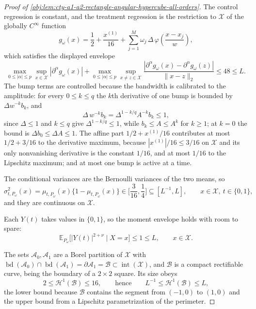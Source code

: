 \begin{proof}[Proof of \cref{obj:lem:cty-a1-a2-rectangle-angular-hypercube-all-orders}]
The control regression is constant, and the treatment regression is the restriction to \(\mathcal X\) of the globally \(C^\infty\) function
\[
g_\omega(x)=\frac12+\frac{x^{(1)}}{16}
+\sum_{j=1}^{M}\omega_j\,\Delta\,\varphi\!\left(\frac{x-x_j}{w}\right),
\]
which satisfies the displayed envelope
\[
\max_{0\leq|\alpha|\leq p}\sup_{x\in\mathcal X}|\partial^\alpha g_\omega(x)|
+
\max_{0\leq|\alpha|\leq p}\sup_{x\neq z\in\mathcal X}
\frac{|\partial^\alpha g_\omega(x)-\partial^\alpha g_\omega(z)|}{\lVert x-z\rVert_2}
\leq 48\leq L .
\]
The bump terms are controlled because the bandwidth is calibrated to the amplitude: for every \(0\leq k\leq q\) the \(k\)th derivative of one bump is bounded by \(\Delta w^{-k}b_k\), and
\[
\Delta\,w^{-k}b_k=\Delta^{1-k/q}A^{-k}b_k\leq1,
\]
since \(\Delta\leq1\) and \(k\leq q\) give \(\Delta^{1-k/q}\leq1\), while \(b_k\leq A\leq A^k\) for \(k\geq1\); at \(k=0\) the bound is \(\Delta b_0\leq\Delta A\leq1\).  The affine part \(1/2+x^{(1)}/16\) contributes at most \(1/2+3/16\) to the derivative maximum, because \(|x^{(1)}|/16\leq3/16\) on \(\mathcal X\) and its only nonvanishing derivative is the constant \(1/16\), and at most \(1/16\) to the Lipschitz maximum; and at most one bump is active at a time.

The conditional variances are the Bernoulli variances of the two means, so
\[
\sigma^2_{t,P_\omega}(x)=\mu_{t,P_\omega}(x)\{1-\mu_{t,P_\omega}(x)\}\in\bigl[\frac3{16},\frac14\bigr]
\subseteq[L^{-1},L],
\qquad x\in\mathcal X,\ t\in\{0,1\},
\]
and they are continuous on \(\mathcal X\).

Each \(Y(t)\) takes values in \(\{0,1\}\), so the moment envelope holds with room to spare:
\[
\mathbb E_{P_\omega}\bigl[|Y(t)|^{2+\nu}\mid X=x\bigr]\leq1\leq L,
\qquad x\in\mathcal X .
\]

The sets \(\mathcal A_0,\mathcal A_1\) are a Borel partition of \(\mathcal X\) with \(\operatorname{bd}(\mathcal A_0)\cap\operatorname{bd}(\mathcal A_1)=\partial\mathcal A_1=\mathcal B\subset\operatorname{int}(\mathcal X)\), and \(\mathcal B\) is a compact rectifiable curve, being the boundary of a \(2\times2\) square.  Its size obeys
\[
2\leq\mathcal H^1(\mathcal B)\leq16,
\qquad\text{hence}\qquad
L^{-1}\leq\mathcal H^1(\mathcal B)\leq L,
\]
the lower bound because \(\mathcal B\) contains the segment from \((-1,0)\) to \((1,0)\) and the upper bound from a Lipschitz parametrization of the perimeter.


\end{proof}
